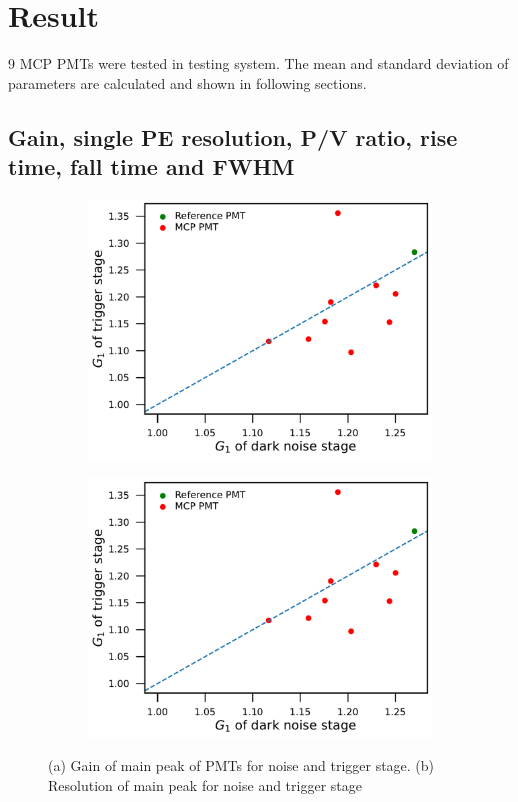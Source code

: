 \section{Result}
\label{Result}
9 MCP PMTs were tested in testing system. The mean and standard deviation of parameters are calculated and shown in following sections.

\subsection{Gain, single PE resolution, P/V ratio, rise time, fall time and FWHM}
\begin{figure}[!htbp]
    \centering
    \begin{subfigure}[b]{0.49\textwidth}
        \includegraphics[width=\textwidth,page=1]{figures/result/compare.pdf}
        \caption{}
        \label{fig:gainCompare}
    \end{subfigure}
    \begin{subfigure}[b]{0.49\textwidth}
        \includegraphics[width=\textwidth,page=2]{figures/result/compare.pdf}
        \caption{}
        \label{fig:speresolutionCompare}
    \end{subfigure}
    \caption{(a) Gain of main peak of PMTs for noise and trigger stage. (b) Resolution of main peak for noise and trigger stage}
\end{figure}
